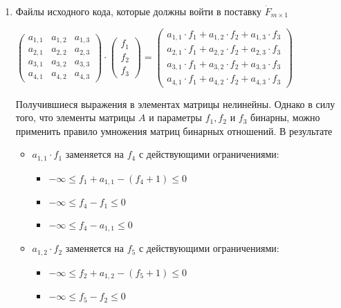 \begin{enumerate}
  \item Файлы исходного кода, которые должны войти в поставку $\dot{F}_{m \times 1}$
  \begin{center}
    $
    \begin{pmatrix}
      a_{1, 1} & a_{1, 2} & a_{1, 3} \\
      a_{2, 1} & a_{2, 2} & a_{2, 3} \\
      a_{3, 1} & a_{3, 2} & a_{3, 3} \\
      a_{4, 1} & a_{4, 2} & a_{4, 3}
    \end{pmatrix}
    \cdot
    \begin{pmatrix}
      f_{1} \\ 
      f_{2} \\
      f_{3} 
    \end{pmatrix}
    =
    \begin{pmatrix}
      a_{1, 1} \cdot f_{1} + a_{1, 2} \cdot f_{2} + a_{1, 3} \cdot f_{3} \\ 
      a_{2, 1} \cdot f_{1} + a_{2, 2} \cdot f_{2} + a_{2, 3} \cdot f_{3} \\
      a_{3, 1} \cdot f_{1} + a_{3, 2} \cdot f_{2} + a_{3, 3} \cdot f_{3} \\ 
      a_{4, 1} \cdot f_{1} + a_{4, 2} \cdot f_{2} + a_{4, 3} \cdot f_{3} 
    \end{pmatrix}
    $
  \end{center}
  Получившиеся выражения в элементах матрицы нелинейны. Однако в силу того, что элементы матрицы $A$ и параметры $f_{1}, f_{2}$ и $f_{3}$ бинарны, можно применить правило умножения матриц бинарных отношений. В результате
  \begin{itemize}
    \item $a_{1, 1} \cdot f_{1}$ заменяется на $f_{4}$ с действующими ограничениями:
    \begin{itemize}
      \item[] $-\infty \le f_{1} + a_{1,1} - (f_{4} + 1) \le 0$ %
      \item[] $-\infty \le f_{4} - f_{1} \le 0$ %
      \item[] $-\infty \le f_{4} - a_{1,1} \le 0$ %
    \end{itemize}
    \item $a_{1, 2} \cdot f_{2}$ заменяется на $f_{5}$ с действующими ограничениями:
    \begin{itemize}
      \item[] $-\infty \le f_{2} + a_{1,2} - (f_{5} + 1) \le 0$ %
      \item[] $-\infty \le f_{5} - f_{2} \le 0$ %

\end{itemize}
\end{itemize}
\end{enumerate}

